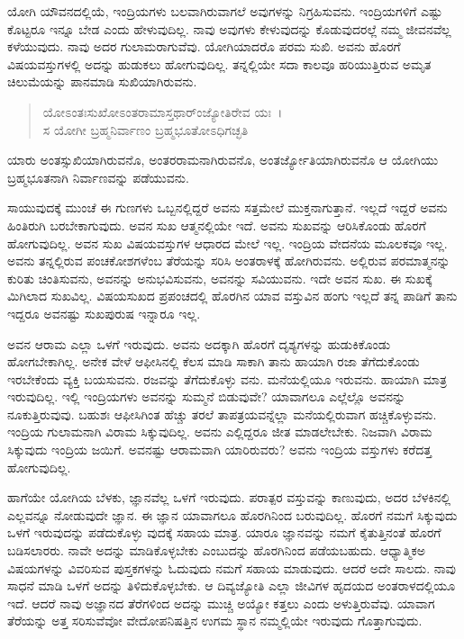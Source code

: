 ಯೋಗಿ ಯೌವನದಲ್ಲಿಯೆ, ಇಂದ್ರಿಯಗಳು ಬಲವಾಗಿರುವಾಗಲೆ ಅವುಗಳನ್ನು ನಿಗ್ರಹಿಸುವನು. ಇಂದ್ರಿಯಗಳಿಗೆ ಎಷ್ಟು ಕೊಟ್ಟರೂ ಇನ್ನೂ ಬೇಡ ಎಂದು ಹೇಳುವುದಿಲ್ಲ. ನಾವು ಅವುಗಳು ಕೇಳುವುದನ್ನು ಕೊಡುವುದರಲ್ಲೆ ನಮ್ಮ ಜೀವನವೆಲ್ಲ ಕಳೆಯುವುದು. ನಾವು ಅದರ ಗುಲಾಮರಾಗುವೆವು. ಯೋಗಿಯಾದರೊ ಪರಮ ಸುಖಿ. ಅವನು ಹೊರಗೆ ವಿಷಯವಸ್ತುಗಳಲ್ಲಿ ಅದನ್ನು ಹುಡುಕಲು ಹೋಗುವುದಿಲ್ಲ. ತನ್ನಲ್ಲಿಯೇ ಸದಾ ಕಾಲವೂ ಹರಿಯುತ್ತಿರುವ ಅಮೃತ ಚಿಲುಮೆಯನ್ನು ಪಾನಮಾಡಿ ಸುಖಿಯಾಗಿರುವನು.

\begin{verse}
ಯೋಽಂತಃಸುಖೋಽಂತರಾಮಾಸ್ತಥಾರ್ಂಜ್ಯೋತಿರೇವ ಯಃ~।\\ಸ ಯೋಗೀ ಬ್ರಹ್ಮನಿರ್ವಾಣಂ ಬ್ರಹ್ಮಭೂತೋಽಧಿಗಚ್ಛತಿ 
\end{verse}

{\small ಯಾರು ಅಂತಸ್ಸುಖಿಯಾಗಿರುವನೊ, ಅಂತರರಾಮನಾಗಿರುವನೊ, ಅಂತರ್ಜ್ಯೋತಿಯಾಗಿರುವನೊ ಆ ಯೋಗಿಯು ಬ್ರಹ್ಮಭೂತನಾಗಿ ನಿರ್ವಾಣವನ್ನು ಪಡೆಯುವನು.}

ಸಾಯುವುದಕ್ಕೆ ಮುಂಚೆ ಈ ಗುಣಗಳು ಒಬ್ಬನಲ್ಲಿದ್ದರೆ ಅವನು ಸತ್ತಮೇಲೆ ಮುಕ್ತನಾಗುತ್ತಾನೆ. ಇಲ್ಲದೆ ಇದ್ದರೆ ಅವನು ಹಿಂತಿರುಗಿ ಬರಬೇಕಾಗುವುದು. ಅವನ ಸುಖ ಆತ್ಮನಲ್ಲಿಯೇ ಇದೆ. ಅವನು ಸುಖವನ್ನು ಆರಿಸಿಕೊಂಡು ಹೊರಗೆ ಹೋಗುವುದಿಲ್ಲ. ಅವನ ಸುಖ ವಿಷಯವಸ್ತುಗಳ ಆಧಾರದ ಮೇಲೆ ಇಲ್ಲ. ಇಂದ್ರಿಯ ವೇದನೆಯ ಮೂಲಕವೂ ಇಲ್ಲ. ಅವನು ತನ್ನಲ್ಲಿರುವ ಪಂಚಕೋಶಗಳೆಂಬ ತೆರೆಯನ್ನು ಸರಿಸಿ ಅಂತರಾಳಕ್ಕೆ ಹೋಗಿರುವನು. ಅಲ್ಲಿರುವ ಪರಮಾತ್ಮನನ್ನು ಕುರಿತು ಚಿಂತಿಸುವನು, ಅವನನ್ನು ಅನುಭವಿಸುವನು, ಅವನನ್ನು ಸವಿಯುವನು. ಇದೇ ಅವನ ಸುಖ. ಈ ಸುಖಕ್ಕೆ ಮಿಗಿಲಾದ ಸುಖವಿಲ್ಲ. ವಿಷಯಸುಖದ ಪ್ರಪಂಚದಲ್ಲಿ ಹೊರಗಿನ ಯಾವ ವಸ್ತುವಿನ ಹಂಗು ಇಲ್ಲದೆ ತನ್ನ ಪಾಡಿಗೆ ತಾನು ಇದ್ದರೂ ಅವನಷ್ಟು ಸುಖಪುರುಷ ಇನ್ನಾರೂ ಇಲ್ಲ.

ಅವನ ಆರಾಮ ಎಲ್ಲಾ ಒಳಗೆ ಇರುವುದು. ಅವನು ಅದಕ್ಕಾಗಿ ಹೊರಗೆ ದೃಶ್ಯಗಳನ್ನು ಹುಡುಕಿಕೊಂಡು ಹೋಗಬೇಕಾಗಿಲ್ಲ. ಅನೇಕ ವೇಳೆ ಆಫೀಸಿನಲ್ಲಿ ಕೆಲಸ ಮಾಡಿ ಸಾಕಾಗಿ ತಾನು ಹಾಯಾಗಿ ರಜಾ ತೆಗೆದುಕೊಂಡು ಇರಬೇಕೆಂದು ವ್ಯಕ್ತಿ ಬಯಸುವನು. ರಜವನ್ನು ತೆಗೆದುಕೊಳ್ಳು ವನು. ಮನೆಯಲ್ಲಿಯೂ ಇರುವನು. ಹಾಯಾಗಿ ಮಾತ್ರ ಇರುವುದಿಲ್ಲ. ಇಲ್ಲಿ ಇಂದ್ರಿಯಗಳು ಅವನನ್ನು ಸುಮ್ಮನೆ ಬಿಡುವುವೇ? ಯಾವಾಗಲೂ ಎಲ್ಲೆಲ್ಲೊ ಅವನನ್ನು ನೂಕುತ್ತಿರುವುವು. ಬಹುಶಃ ಆಫೀಸಿಗಿಂತ ಹೆಚ್ಚು ತರಲೆ ತಾಪತ್ರಯವನ್ನೆಲ್ಲಾ ಮನೆಯಲ್ಲಿರುವಾಗ ಹಚ್ಚಿಕೊಳ್ಳುವನು. ಇಂದ್ರಿಯ ಗುಲಾಮನಾಗಿ ವಿರಾಮ ಸಿಕ್ಕುವುದಿಲ್ಲ. ಅವನು ಎಲ್ಲಿದ್ದರೂ ಜೀತ ಮಾಡಲೇಬೇಕು. ನಿಜವಾಗಿ ವಿರಾಮ ಸಿಕ್ಕುವುದು ಇಂದ್ರಿಯ ಜಯಿಗೆ. ಅವನಷ್ಟು ಆರಾಮವಾಗಿ ಯಾರಿರುವರು? ಅವನು ಇಂದ್ರಿಯ ವಸ್ತುಗಳು ಕರೆದತ್ತ ಹೋಗುವುದಿಲ್ಲ.

ಹಾಗೆಯೇ ಯೋಗಿಯ ಬೆಳಕು, ಜ್ಞಾನವೆಲ್ಲ ಒಳಗೆ ಇರುವುದು. ಪರಾತ್ಪರ ವಸ್ತುವನ್ನು ಕಾಣುವುದು, ಅದರ ಬೆಳಕಿನಲ್ಲಿ ಎಲ್ಲವನ್ನೂ ನೋಡುವುದೇ ಜ್ಞಾನ. ಈ ಜ್ಞಾನ ಯಾವಾಗಲೂ ಹೊರಗಿನಿಂದ ಬರುವುದಿಲ್ಲ. ಹೊರಗೆ ನಮಗೆ ಸಿಕ್ಕುವುದು ಒಳಗೆ ಇರುವುದನ್ನು ಪಡೆದುಕೊಳ್ಳು ವುದಕ್ಕೆ ಸಹಾಯ ಮಾತ್ರ. ಯಾರೂ ಜ್ಞಾನವನ್ನು ನಮಗೆ ಕೈತುತ್ತಿನಂತೆ ಹೊರಗೆ ಬಡಿಸಲಾರರು. ನಾವೇ ಅದನ್ನು ಮಾಡಿಕೊಳ್ಳಬೇಕು ಎಂಬುದನ್ನು ಹೊರಗಿನಿಂದ ಪಡೆಯಬಹುದು. ಆಧ್ಯಾತ್ಮಿಕಅ ವಿಷಯಗಳನ್ನು ವಿವರಿಸುವ ಪುಸ್ತಕಗಳನ್ನು ಓದುವುದು ನಮಗೆ ಸಹಾಯ ಮಾಡುವುದು. ಆದರೆ ಅದೇ ಸಾಲದು. ನಾವು ಸಾಧನೆ ಮಾಡಿ ಒಳಗೆ ಅದನ್ನು ತಿಳಿದುಕೊಳ್ಳಬೇಕು. ಆ ದಿವ್ಯಜ್ಯೋತಿ ಎಲ್ಲಾ ಜೀವಿಗಳ ಹೃದಯದ ಅಂತರಾಳದಲ್ಲಿಯೂ ಇದೆ. ಆದರೆ ನಾವು ಅಜ್ಞಾನದ ತೆರೆಗಳಿಂದ ಅದನ್ನು ಮುಚ್ಚಿ ಅಯ್ಯೋ ಕತ್ತಲು ಎಂದು ಅಳುತ್ತಿರುವೆವು. ಯಾವಾಗ ತೆರೆಯನ್ನು ಅತ್ತ ಸರಿಸುವೆವೋ ವೇದೋಪನಿಷತ್ತಿನ ಉಗಮ ಸ್ಥಾನ ನಮ್ಮಲ್ಲಿಯೇ ಇರುವುದು ಗೊತ್ತಾಗುವುದು.

